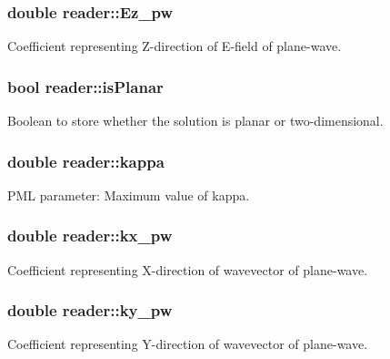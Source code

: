 \subsubsection[{\texorpdfstring{Ez\+\_\+pw}{Ez_pw}}]{\setlength{\rightskip}{0pt plus 5cm}double reader\+::\+Ez\+\_\+pw}\hypertarget{classreader_a110c6d591bc270709946c1e5ed24f6d1}{}\label{classreader_a110c6d591bc270709946c1e5ed24f6d1}
Coefficient representing Z-\/direction of E-\/field of plane-\/wave. 
\subsubsection[{\texorpdfstring{is\+Planar}{isPlanar}}]{\setlength{\rightskip}{0pt plus 5cm}bool reader\+::is\+Planar}\hypertarget{classreader_a7cc8fcbdd1e92c55a2dd1fafcfe957e9}{}\label{classreader_a7cc8fcbdd1e92c55a2dd1fafcfe957e9}
Boolean to store whether the solution is planar or two-\/dimensional. 
\subsubsection[{\texorpdfstring{kappa}{kappa}}]{\setlength{\rightskip}{0pt plus 5cm}double reader\+::kappa}\hypertarget{classreader_a227a780cfc649c4a952eb97d871ace0f}{}\label{classreader_a227a780cfc649c4a952eb97d871ace0f}
P\+ML parameter\+: Maximum value of kappa. 
\subsubsection[{\texorpdfstring{kx\+\_\+pw}{kx_pw}}]{\setlength{\rightskip}{0pt plus 5cm}double reader\+::kx\+\_\+pw}\hypertarget{classreader_af025b854353d36ff0e68eebe6c6de4c9}{}\label{classreader_af025b854353d36ff0e68eebe6c6de4c9}
Coefficient representing X-\/direction of wavevector of plane-\/wave. 
\subsubsection[{\texorpdfstring{ky\+\_\+pw}{ky_pw}}]{\setlength{\rightskip}{0pt plus 5cm}double reader\+::ky\+\_\+pw}\hypertarget{classreader_ad4c50ac42cf11005e68881c8ee2db449}{}\label{classreader_ad4c50ac42cf11005e68881c8ee2db449}
Coefficient representing Y-\/direction of wavevector of plane-\/wave. 
